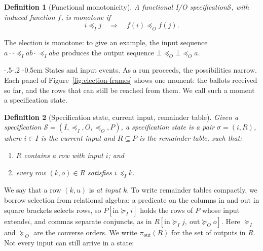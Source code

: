 \documentclass[sigconf]{cidr-2027}
\makeatletter
\newtheorem{definition}{Definition}
\theoremstyle{remark}
\renewcommand\paragraph{\@startsection{paragraph}{4}{\z@}%
  {-.5\baselineskip \@plus -2\p@ \@minus -.2\p@}%
  {-0.5em}%
  {\normalfont\bfseries}}
\newcommand{\InputOrd}{\preceq_I}
\newcommand{\OutputOrd}{\preceq_O}
\newcommand{\InputGe}{\succeq_I}
\newcommand{\OutputGe}{\succeq_O}
\newcommand{\inrel}{extends\xspace}          %
\newcommand{\Spec}{\mathcal{S}}
\newcommand{\spectype}[1][]{I/O specification#1\xspace}
\makeatother
\begin{document}
\begin{definition}[Functional monotonicity]
\label{def:functional-monotonicity}
A functional \spectype $\Spec$, with induced function $f$, is
\emph{monotone} if
\begin{equation}
  i\InputOrd j
  \quad\Longrightarrow\quad
  f(i)\OutputOrd f(j).
  \label{eq:functional-monotonicity}
\end{equation}
\end{definition}

\textcolor{reviewed}{The election is monotone: to give an example, the input sequence
$a\cdot\cdot\InputOrd ab\cdot\InputOrd aba$ produces the output sequence
$\bot\OutputOrd\bot\OutputOrd a$.}

\paragraph{States and input events.}
\textcolor{reviewed}{As a run proceeds, the possibilities narrow.} \textcolor{reviewed}{Each panel of
Figure~\ref{fig:election-frames} shows one moment: the ballots received so
far, and the rows that can still be reached from them.} \textcolor{reviewed}{We call such a moment
a specification state.}

\begin{definition}[Specification state, current input, remainder table]
\label{def:residual-state}
Given a specification $\Spec=(I,\InputOrd,O,\OutputOrd,P)$, a \emph{specification state} is a
pair $\sigma=(i,R)$, where $i\in I$ is the \emph{current input} and
$R\subseteq P$ is the \emph{remainder table}, such that:
\begin{enumerate}
\item
$R$ contains a row with input $i$; and
\item
every row $(k,o)\in R$ satisfies $i\InputOrd k$.
\end{enumerate}
\end{definition}

We say that a row $(k,u)$ is
\emph{at input} $k$. \textcolor{reviewed}{To write remainder tables compactly, we borrow selection
from relational algebra: a predicate on the columns $\mathrm{in}$ and
$\mathrm{out}$ in square brackets selects rows, so $P[\mathrm{in}\InputGe i]$
holds the rows of $P$ whose input \inrel $i$, and commas separate conjuncts, as
in $R[\mathrm{in}\InputGe j,\ \mathrm{out}\OutputGe o]$.} Here $\InputGe$ and
$\OutputGe$ are the converse orders. \textcolor{reviewed}{We write $\pi_{\mathrm{out}}(R)$ for the
set of outputs in $R$.} Not every input can still arrive in a state:
\end{document}
